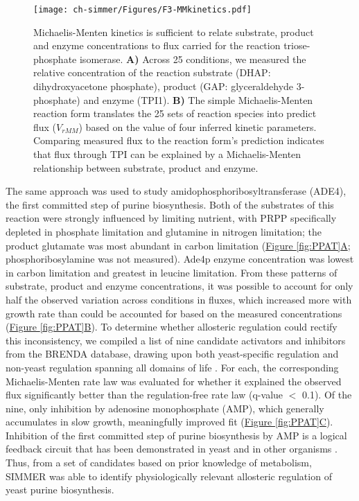 \begin{figure}[h!]
\texttt{[image: ch-simmer/Figures/F3-MMkinetics.pdf]}
\caption[Michaelis-Menten kinetics is sufficient to relate substrate, product and enzyme concentrations to flux carried for the reaction triose-phosphate isomerase]{Michaelis-Menten kinetics is sufficient to relate substrate, product and enzyme concentrations to flux carried for the reaction triose-phosphate isomerase.  \textbf{A)} Across 25 conditions, we measured the relative concentration of the reaction substrate (DHAP: dihydroxyacetone phosphate), product (GAP: glyceraldehyde 3-phosphate) and enzyme (TPI1).  \textbf{B)} The simple Michaelis-Menten reaction form translates the 25 sets of reaction species into predict flux ($V_{rMM}$) based on the value of four inferred kinetic parameters.  Comparing measured flux to the reaction form's prediction indicates that flux through TPI can be explained by a Michaelis-Menten relationship between substrate, product and enzyme.}
\label{fig:TPI}
\end{figure}

The same approach was used to study amidophosphoribosyltransferase (ADE4), the first committed step of purine biosynthesis. Both of the substrates of this reaction were strongly influenced by limiting nutrient, with PRPP specifically depleted in phosphate limitation and glutamine in nitrogen limitation; the product glutamate was most abundant in carbon limitation (\hyperref[fig:PPAT]{Figure \ref{fig:PPAT}A}; phosphoribosylamine was not measured). Ade4p enzyme concentration was lowest in carbon limitation and greatest in leucine limitation. From these patterns of substrate, product and enzyme concentrations, it was possible to account for only half the observed variation across conditions in fluxes, which increased more with growth rate than could be accounted for based on the measured concentrations (\hyperref[fig:PPAT]{Figure \ref{fig:PPAT}B}). To determine whether allosteric regulation could rectify this inconsistency, we compiled a list of nine candidate activators and inhibitors from the BRENDA database, drawing upon both yeast-specific regulation and non-yeast regulation spanning all domains of life \cite{Scheer:2011df}. For each, the corresponding Michaelis-Menten rate law was evaluated for whether it explained the observed flux significantly better than the regulation-free rate law (q-value $<$ 0.1). Of the nine, only inhibition by adenosine monophosphate (AMP), which generally accumulates in slow growth, meaningfully improved fit (\hyperref[fig:PPAT]{Figure \ref{fig:PPAT}C}). Inhibition of the first committed step of purine biosynthesis by AMP is a logical feedback circuit that has been demonstrated in yeast and in other organisms \cite{WYNGAARDEN:1959wf, Jones:1982dn, Scheer:2011df}. Thus, from a set of candidates based on prior knowledge of metabolism, SIMMER was able to identify physiologically relevant allosteric regulation of yeast purine biosynthesis.

